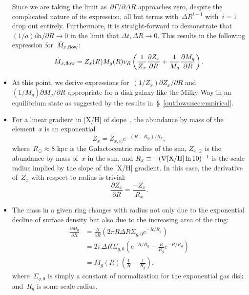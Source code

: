 \documentclass[main.tex]{subfiles}
\begin{document}
\begin{itemize}
	Since we are taking the limit as~$\partial \Gamma / \partial \Delta R$
	approaches zero, despite the complicated nature of its expression, all but
	terms with~$\Delta R^{i - 1}$ with~$i = 1$ drop out entirely.
	Furthermore, it is straight-forward to demonstrate that~$(1 / a) \partial a
	/ \partial R \rightarrow 0$ in the limit that $\Delta t, \Delta R
	\rightarrow 0$.
	This results in the following expression for~$\dot{M}_{x,\text{flow}}$:
	\begin{equation}
	\dot{M}_{x,\text{flow}} = Z_x(R) M_g(R) v_R \left(
	\frac{1}{Z_x} \frac{\partial Z_x}{\partial R} +
	\frac{1}{M_g} \frac{\partial M_g}{\partial R}
	\right).
	\label{outflows:eq:mdot-flow-general}
	\end{equation}

	\item At this point, we derive expressions for~$(1 / Z_x) \partial Z_x /
	\partial R$ and~$(1 / M_g) \partial M_g / \partial R$ appropriate for a
	disk galaxy like the Milky Way in an equilibrium state as suggested by
	the results in~\S~\ref{outflows:sec:empirical}.

	\item For a linear gradient in [X/H] of slope~, the abundance by
	mass of the element~$x$ is an exponential
	\begin{equation}
	Z_x = Z_{x,\odot} e^{-(R - R_\odot) / R_x},
	\end{equation}
	where~$R_\odot \approx 8$ kpc is the Galactocentric radius of the sun,
	$Z_{x,\odot}$ is the abundance by mass of~$x$ in the sun, and
	$R_x \equiv -(\nabla\text{[X/H]} \ln 10)^{-1}$ is the scale radius implied by the
	slope of the [X/H] gradient.
	In this case, the derivative of~$Z_x$ with respect to radius is trivial:
	\begin{equation}
	\frac{\partial Z_x}{\partial R} = \frac{-Z_x}{R_x}.
	\label{outflows:eq:partial-zx-radius}
	\end{equation}

	\item The mass in a given ring changes with radius not only due to the
	exponential decline of surface density but also due to the increasing area
	of the ring:
	\begin{equation}\begin{split}
	\frac{\partial M_g}{\partial R} &= \frac{\partial}{\partial R}
	\left(2 \pi R \Delta R \Sigma_{g,0} e^{-R / R_g}\right)
	\\
	&= 2 \pi \Delta R \Sigma_{g,0} \left(e^{-R / R_g} - \frac{R}{R_g}
	e^{-R / R_g}\right)
	\\
	&= M_g(R) \left(\frac{1}{R} - \frac{1}{R_g}\right),
	\label{outflows:eq:partial-mgas-radius}
	\end{split}\end{equation}
	where~$\Sigma_{g,0}$ is simply a constant of normalization for the
	exponential gas disk and~$R_g$ is some scale radius.


\end{itemize}
\end{document}
